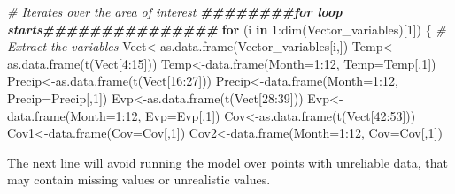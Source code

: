 \documentclass[
  10pt,
  b5paper,
]{book}
\newenvironment{Shaded}{\begin{snugshade}}{\end{snugshade}}
\newcommand{\AttributeTok}[1]{\textcolor[rgb]{0.77,0.63,0.00}{#1}}
\newcommand{\CommentTok}[1]{\textcolor[rgb]{0.56,0.35,0.01}{\textit{#1}}}
\newcommand{\ControlFlowTok}[1]{\textcolor[rgb]{0.13,0.29,0.53}{\textbf{#1}}}
\newcommand{\DecValTok}[1]{\textcolor[rgb]{0.00,0.00,0.81}{#1}}
\newcommand{\DocumentationTok}[1]{\textcolor[rgb]{0.56,0.35,0.01}{\textbf{\textit{#1}}}}
\newcommand{\FunctionTok}[1]{\textcolor[rgb]{0.00,0.00,0.00}{#1}}
\newcommand{\NormalTok}[1]{#1}
\newcommand{\OtherTok}[1]{\textcolor[rgb]{0.56,0.35,0.01}{#1}}
\newcommand{\SpecialCharTok}[1]{\textcolor[rgb]{0.00,0.00,0.00}{#1}}
\begin{document}
\begin{Shaded}
\begin{Highlighting}[]
\CommentTok{\# Iterates over the area of interest}
\DocumentationTok{\#\#\#\#\#\#\#\#for loop starts\#\#\#\#\#\#\#\#\#\#\#\#\#\#\#}
\ControlFlowTok{for}\NormalTok{ (i }\ControlFlowTok{in} \DecValTok{1}\SpecialCharTok{:}\FunctionTok{dim}\NormalTok{(Vector\_variables)[}\DecValTok{1}\NormalTok{]) \{}
\CommentTok{\# Extract the variables }
\NormalTok{Vect}\OtherTok{\textless{}{-}}\FunctionTok{as.data.frame}\NormalTok{(Vector\_variables[i,])}
\NormalTok{Temp}\OtherTok{\textless{}{-}}\FunctionTok{as.data.frame}\NormalTok{(}\FunctionTok{t}\NormalTok{(Vect[}\DecValTok{4}\SpecialCharTok{:}\DecValTok{15}\NormalTok{]))}
\NormalTok{Temp}\OtherTok{\textless{}{-}}\FunctionTok{data.frame}\NormalTok{(}\AttributeTok{Month=}\DecValTok{1}\SpecialCharTok{:}\DecValTok{12}\NormalTok{, }\AttributeTok{Temp=}\NormalTok{Temp[,}\DecValTok{1}\NormalTok{])}
\NormalTok{Precip}\OtherTok{\textless{}{-}}\FunctionTok{as.data.frame}\NormalTok{(}\FunctionTok{t}\NormalTok{(Vect[}\DecValTok{16}\SpecialCharTok{:}\DecValTok{27}\NormalTok{]))}
\NormalTok{Precip}\OtherTok{\textless{}{-}}\FunctionTok{data.frame}\NormalTok{(}\AttributeTok{Month=}\DecValTok{1}\SpecialCharTok{:}\DecValTok{12}\NormalTok{, }\AttributeTok{Precip=}\NormalTok{Precip[,}\DecValTok{1}\NormalTok{])}
\NormalTok{Evp}\OtherTok{\textless{}{-}}\FunctionTok{as.data.frame}\NormalTok{(}\FunctionTok{t}\NormalTok{(Vect[}\DecValTok{28}\SpecialCharTok{:}\DecValTok{39}\NormalTok{]))}
\NormalTok{Evp}\OtherTok{\textless{}{-}}\FunctionTok{data.frame}\NormalTok{(}\AttributeTok{Month=}\DecValTok{1}\SpecialCharTok{:}\DecValTok{12}\NormalTok{, }\AttributeTok{Evp=}\NormalTok{Evp[,}\DecValTok{1}\NormalTok{])}
\NormalTok{Cov}\OtherTok{\textless{}{-}}\FunctionTok{as.data.frame}\NormalTok{(}\FunctionTok{t}\NormalTok{(Vect[}\DecValTok{42}\SpecialCharTok{:}\DecValTok{53}\NormalTok{]))}
\NormalTok{Cov1}\OtherTok{\textless{}{-}}\FunctionTok{data.frame}\NormalTok{(}\AttributeTok{Cov=}\NormalTok{Cov[,}\DecValTok{1}\NormalTok{])}
\NormalTok{Cov2}\OtherTok{\textless{}{-}}\FunctionTok{data.frame}\NormalTok{(}\AttributeTok{Month=}\DecValTok{1}\SpecialCharTok{:}\DecValTok{12}\NormalTok{, }\AttributeTok{Cov=}\NormalTok{Cov[,}\DecValTok{1}\NormalTok{])}
\end{Highlighting}
\end{Shaded}

The next line will avoid running the model over points with unreliable data, that may contain missing values or unrealistic values.
\end{document}
